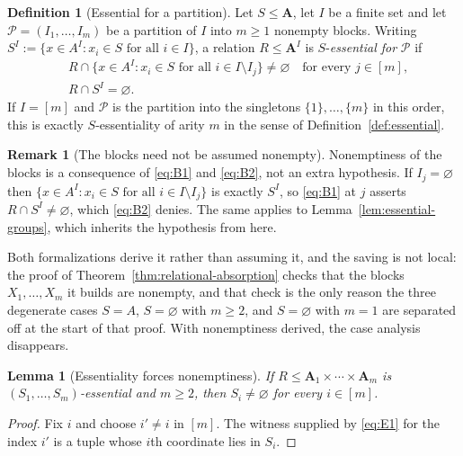 \documentclass[11pt]{article}
\theoremstyle{mainplain}
\newtheorem{lemma}[theorem]{Lemma}
\theoremstyle{mainroman}
\theoremstyle{definition}
\newtheorem{definition}[theorem]{Definition}
\newtheorem{remark}[theorem]{Remark}
\numberwithin{equation}{section}
\newcommand{\bA}{\mathbf A}
\begin{document}
\begin{definition}[Essential for a partition]\label{def:block-essential}
Let $S\le\bA$, let $I$ be a finite set and let $\mathcal P=(I_1,\dots,I_m)$ be a
partition of $I$ into $m\ge1$ nonempty blocks. Writing
$S^{I}:=\{x\in A^{I}:x_i\in S\text{ for all }i\in I\}$, a relation
$R\le\bA^{I}$ is $S$-\emph{essential for} $\mathcal P$ if
\begin{align}
 &R\cap\{x\in A^{I}:x_i\in S\text{ for all }i\in I\setminus I_j\}\ne\varnothing
 \quad\text{for every }j\in[m],\label{eq:B1}\\
 &R\cap S^{I}=\varnothing.\label{eq:B2}
\end{align}
If $I=[m]$ and $\mathcal P$ is the partition into the singletons
$\{1\},\dots,\{m\}$ in this order, this is exactly $S$-essentiality of arity
$m$ in the sense of Definition~\ref{def:essential}.
\end{definition}

\begin{remark}[The blocks need not be assumed nonempty]\label{rem:blocks-nonempty-free}
Nonemptiness of the blocks is a consequence of \eqref{eq:B1} and
\eqref{eq:B2}, not an extra hypothesis. If $I_j=\varnothing$ then
$\{x\in A^{I}:x_i\in S\text{ for all }i\in I\setminus I_j\}$ is exactly
$S^{I}$, so \eqref{eq:B1} at $j$ asserts $R\cap S^{I}\ne\varnothing$, which
\eqref{eq:B2} denies. The same applies to
Lemma~\ref{lem:essential-groups}, which inherits the hypothesis from here.

Both formalizations derive it rather than assuming it, and the saving is not
local: the proof of Theorem~\ref{thm:relational-absorption} checks that the
blocks $X_1,\dots,X_m$ it builds are nonempty, and that check is the only
reason the three degenerate cases $S=A$, $S=\varnothing$ with $m\ge2$, and
$S=\varnothing$ with $m=1$ are separated off at the start of that proof. With
nonemptiness derived, the case analysis disappears.
\end{remark}

\begin{lemma}[Essentiality forces nonemptiness]\label{lem:essential-nonempty}
If $R\le\bA_1\times\cdots\times\bA_m$ is $(S_1,\dots,S_m)$-essential and
$m\ge2$, then $S_i\ne\varnothing$ for every $i\in[m]$.
\end{lemma}
\begin{proof}
Fix $i$ and choose $i'\ne i$ in $[m]$. The witness supplied by
\eqref{eq:E1} for the index $i'$ is a tuple whose $i$th coordinate lies in
$S_i$.
\end{proof}
\end{document}
